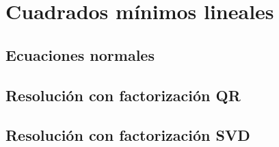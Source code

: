 
\section{Cuadrados mínimos lineales}
\subsection{Ecuaciones normales}
\subsection{Resolución con factorización QR}
\subsection{Resolución con factorización SVD}
